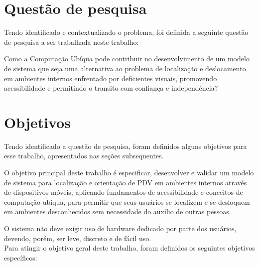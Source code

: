 \documentclass[english,brazilian]{UNISINOSmonografia}
\begin{document}
	\section{Questão de pesquisa}
	Tendo identificado e contextualizado o problema, foi definida a seguinte questão de pesquisa a ser trabalhada neste trabalho:

	Como a Computação Ubíqua pode contribuir no desenvolvimento de um modelo de sistema que seja uma alternativa ao problema de localização e deslocamento em ambientes internos enfrentado por deficientes visuais, promovendo acessibilidade e permitindo o transito com confiança e independência?


	\section{Objetivos}
	Tendo identificado a questão de pesquisa, foram definidos alguns objetivos para esse trabalho, apresentados nas seções subsequentes.
	
		O objetivo principal deste trabalho é especificar, desenvolver e validar um modelo de sistema para localização e orientação de PDV em ambientes internos através de dispositivos móveis, aplicando fundamentos de acessibilidade e conceitos de computação ubíqua, para permitir que seus usuários se localizem e se desloquem em ambientes desconhecidos sem necessidade do auxílio de outras pessoas.

		O sistema não deve exigir uso de hardware dedicado por parte dos usuários, devendo, porém, ser leve, discreto e de fácil uso. \\
		
		Para atingir o objetivo geral deste trabalho, foram definidos os seguintes objetivos específicos:
\end{document}
